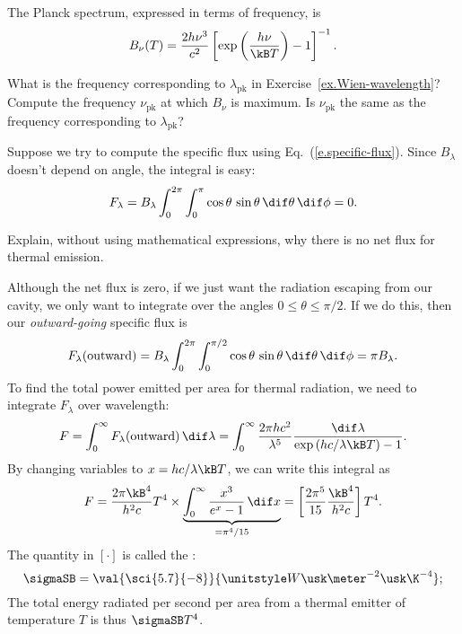 The Planck spectrum, expressed in terms of frequency, is
\begin{equation}\label{e.planck-spectrum-frequency}
B_{\nu}(T) = \frac{2h\nu^{3}}{c^{2}} \left[\exp\left(\frac{h\nu}{\kB T}\right)-1\right]^{-1}.
\end{equation}

\begin{exercisebox}
What is the frequency corresponding to $\lambda_{\mathrm{pk}}$ in Exercise~\ref{ex.Wien-wavelength}? Compute the frequency $\nu_{\mathrm{pk}}$ at which $B_{\nu}$ is maximum. Is $\nu_{\mathrm{pk}}$ the same as the frequency corresponding to $\lambda_{\mathrm{pk}}$?
\end{exercisebox}

Suppose we try to compute the specific flux using Eq.~(\ref{e.specific-flux}). Since $B_{\lambda}$ doesn't depend on angle, the integral is easy:
\[ F_{\lambda} = B_{\lambda}\int_{0}^{2\pi}\int_{0}^{\pi}\cos\theta\,\sin\theta\,\dif\theta\,\dif\phi = 0. \]

\begin{exercisebox}
Explain, without using mathematical expressions, why there is no net flux for thermal emission.
\end{exercisebox}

Although the net flux is zero, if we just want the radiation escaping from our cavity, we only want to integrate over the angles $0\le\theta\le\pi/2$. If we do this, then our \emph{outward-going} specific flux is
\begin{equation}\label{e.outward-thermal-flux}
 F_{\lambda}(\mathrm{outward}) = B_{\lambda}\int_{0}^{2\pi}\int_{0}^{\pi/2}\cos\theta\,\sin\theta\,\dif\theta\,\dif\phi = \pi B_{\lambda}.
\end{equation}
To find the total power emitted per area for thermal radiation, we need to integrate $F_{\lambda}$ over wavelength:
\begin{equation}\label{e.bolometric-thermal-flux}
F = \int_{0}^{\infty}F_{\lambda}(\mathrm{outward})\,\dif\lambda 
	= \int_{0}^{\infty} \frac{2\pi hc^{2}}{\lambda^{5}} \frac{\dif\lambda}{\exp\left(hc/\lambda\kB T\right)-1}.
\end{equation}
By changing variables to $x = hc/\lambda\kB T$, we can write this integral as
\[
	F = \frac{2\pi\kB^{4}}{h^{2}c}T^{4}\times \underbrace{\int_{0}^{\infty}\frac{x^{3}}{e^{x}-1}\,\dif x}_{=\pi^{4}/15} = \left[\frac{2\pi^{5}}{15}\frac{\kB^{4}}{h^{2}c}\right] T^{4}.
\]
The quantity in $\left[\cdot\right]$ is called the :
\[
	\sigmaSB = \val{\sci{5.7}{-8}}{\watt\usk\meter^{-2}\usk\K^{-4}};
\]
The total energy radiated per second per area from a thermal emitter of temperature $T$ is thus $\sigmaSB T^{4}$.

